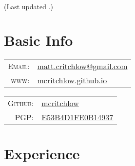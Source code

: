 \documentclass[letterpaper,10pt]{article}
\author{Matthew Critchlow}
\date{\today}
\renewcommand{\maketitle}{
\par{\centering{\Huge  \textsc{\theauthor}}\par}
{\footnotesize\hfill{}\color{lightgray}(Last updated \thedate.)}}
\begin{document}
\maketitle

\section{Basic Info}

\vspace{.25cm}

\begin{minipage}[t]{.5\linewidth}

\begin{tabular}{rp{.75\linewidth}}
    \textsc{Email:}     & \href{mailto:matt.critchlow@gmail.com}{matt.critchlow@gmail.com}\\
    \textsc{www:}&\href{https://mcritchlow.github.io}{mcritchlow.github.io}
\end{tabular}
\end{minipage}
\begin{minipage}[t]{.5\linewidth}
\begin{tabular}{rl}
\textsc{Github:} & \href{http://github.com/mcritchlow}{mcritchlow}\\
\textsc{PGP:}&\href{http://pgp.mit.edu/pks/lookup?op=get&search=0xE53B4D1FE0B14937}{E53B4D1FE0B14937}
\end{tabular}
\end{minipage}

\vspace{.25cm}

\section{Experience}
\end{document}
